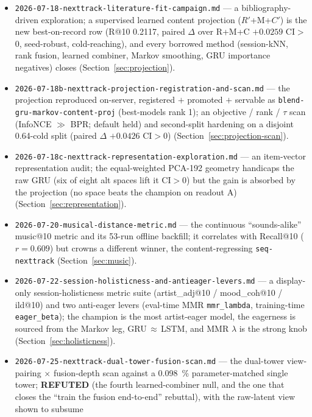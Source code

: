 \documentclass[11pt]{article}
\newcommand{\Rp}{\ensuremath{R'}}
\newcommand{\Cp}{\ensuremath{C'}}
\begin{document}
\begin{itemize}
  \item \texttt{2026-07-18-nexttrack-literature-fit-campaign.md} --- a
    bibliography-driven exploration; a supervised learned content projection
    (\Rp+M+\Cp) is the new best-on-record row (R@10 \num{0.2117}, paired $\Delta$
    over R+M+C $+\num{0.0259}$ CI$>$0, seed-robust, cold-reaching), and every
    borrowed method (session-kNN, rank fusion, learned combiner, Markov smoothing,
    GRU importance negatives) closes (Section~\ref{sec:projection}).
  \item \texttt{2026-07-18b-nexttrack-projection-registration-and-scan.md} --- the
    projection reproduced on-server, registered $+$ promoted $+$ servable as
    \texttt{blend-gru-markov-content-proj} (best-models rank 1); an objective / rank
    / $\tau$ scan (InfoNCE $\gg$ BPR; default held) and second-split hardening on a
    disjoint 0.64-cold split (paired $\Delta$ $+\num{0.0426}$ CI$>$0)
    (Section~\ref{sec:projection-scan}).
  \item \texttt{2026-07-18c-nexttrack-representation-exploration.md} --- an
    item-vector representation audit; the equal-weighted PCA-192 geometry handicaps
    the raw GRU (six of eight alt spaces lift it CI$>$0) but the gain is absorbed by
    the projection (no space beats the champion on readout A)
    (Section~\ref{sec:representation}).
  \item \texttt{2026-07-20-musical-distance-metric.md} --- the continuous
    ``sounds-alike'' music@10 metric and its 53-run offline backfill; it correlates
    with Recall@10 ($r=\num{0.609}$) but crowns a different winner, the
    content-regressing \texttt{seq-nexttrack} (Section~\ref{sec:music}).
  \item \texttt{2026-07-22-session-holisticness-and-antieager-levers.md} ---
    a display-only session-holisticness metric suite (artist\_adj@10 /
    mood\_coh@10 / ild@10) and two anti-eager levers (eval-time MMR
    \texttt{mmr\_lambda}, training-time \texttt{eager\_beta}); the champion is
    the most artist-eager model, the eagerness is sourced from the Markov leg,
    GRU\,$\approx$\,LSTM, and MMR $\lambda$ is the strong knob
    (Section~\ref{sec:holisticness}).
  \item \texttt{2026-07-25-nexttrack-dual-tower-fusion-scan.md} --- the
    dual-tower view-pairing $\times$ fusion-depth scan against a
    \SI{0.098}{\percent} parameter-matched single tower; \textbf{REFUTED} (the
    fourth learned-combiner null, and the one that closes the ``train the fusion
    end-to-end'' rebuttal), with the raw-latent view shown to subsume

\end{itemize}
\end{document}
